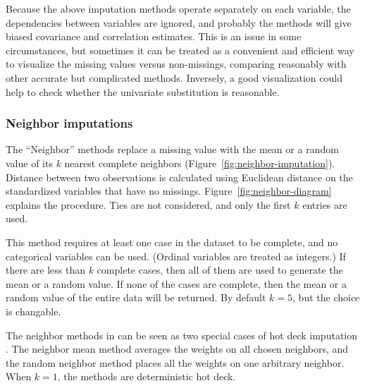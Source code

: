 \documentclass[article]{jss}
\begin{document}
Because the above imputation methods operate separately on each variable, the dependencies between variables are ignored, and probably the methods will give biased covariance and correlation estimates. This is an issue in some circumstances, but sometimes it can be treated as a convenient and efficient way to visualize the missing values versus non-missings, comparing reasonably with other accurate but complicated methods. Inversely, a good visualization could help to check whether the univariate substitution is reasonable.


\subsubsection{Neighbor imputations}

The ``Neighbor'' methods replace a missing value with the mean or a random value of its $k$ nearest complete neighbors (Figure~\ref{fig:neighbor-imputation}). Distance between two observations is calculated using Euclidean distance on the standardized variables that have no missings. Figure~\ref{fig:neighbor-diagram} explains the procedure. Ties are not considered, and only the first $k$ entries are used. 

This method requires at least one case in the dataset to be complete, and no categorical variables can be used. (Ordinal variables are treated as integers.) If there are less than $k$ complete cases, then all of them are used to generate the mean or a random value. If none of the cases are complete, then the mean or a random value of the entire data will be returned. By default $k=5$, but the choice is changable.


The neighbor methods in  can be seen as two special cases of hot deck imputation \citep{andridge2010review}. The neighbor mean method averages the weights on all chosen neighbors, and the random neighbor method places all the weights on one arbitrary neighbor. When $k=1$, the methods are deterministic hot deck.
\end{document}
